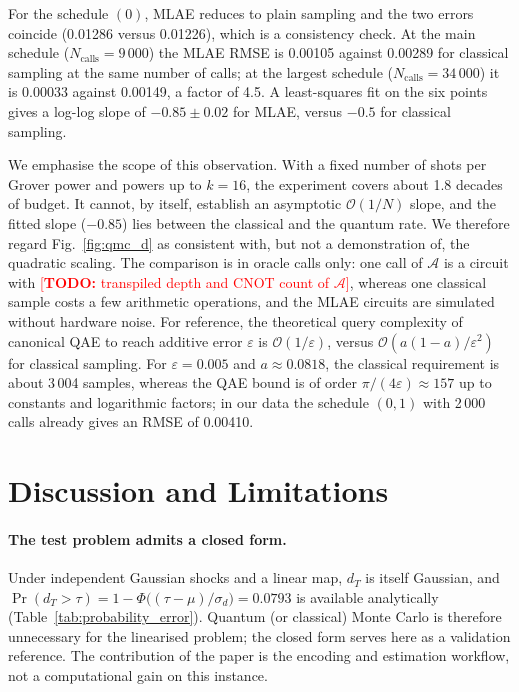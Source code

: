 \documentclass[pdflatex,sn-mathphys-num]{sn-jnl}%
\newcommand{\todo}[1]{\textcolor{red}{[\textbf{TODO:} #1]}}
\theoremstyle{thmstyleone}%
\theoremstyle{thmstyletwo}%
\theoremstyle{thmstylethree}%
\begin{document}
For the schedule $(0)$, MLAE reduces to plain sampling and the two errors coincide (0.01286 versus 0.01226), which is a consistency check. At the main schedule ($N_{\mathrm{calls}}=9\,000$) the MLAE RMSE is 0.00105 against 0.00289 for classical sampling at the same number of calls; at the largest schedule ($N_{\mathrm{calls}}=34\,000$) it is 0.00033 against 0.00149, a factor of 4.5. A least-squares fit on the six points gives a log-log slope of $\ensuremath{-0.85}\pm0.02$ for MLAE, versus $-0.5$ for classical sampling.

We emphasise the scope of this observation. With a fixed number of shots per Grover power and powers up to $k=16$, the experiment covers about 1.8 decades of budget. It cannot, by itself, establish an asymptotic $\mathcal{O}(1/N)$ slope, and the fitted slope ($\ensuremath{-0.85}$) lies between the classical and the quantum rate. We therefore regard Fig.~\ref{fig:qmc_d} as consistent with, but not a demonstration of, the quadratic scaling. The comparison is in oracle calls only: one call of $\mathcal A$ is a circuit with \todo{transpiled depth and CNOT count of $\mathcal A$}, whereas one classical sample costs a few arithmetic operations, and the MLAE circuits are simulated without hardware noise. For reference, the theoretical query complexity of canonical QAE to reach additive error $\varepsilon$ is $\mathcal{O}(1/\varepsilon)$, versus $\mathcal{O}(a(1-a)/\varepsilon^2)$ for classical sampling. For $\varepsilon=0.005$ and $a\approx0.0818$, the classical requirement is about 3\,004 samples, whereas the QAE bound is of order $\pi/(4\varepsilon)\approx157$ up to constants and logarithmic factors; in our data the schedule $(0,1)$ with 2\,000 calls already gives an RMSE of 0.00410.

\section{Discussion and Limitations}\label{sec_disc}

\paragraph{The test problem admits a closed form.} Under independent Gaussian shocks and a linear map, $d_T$ is itself Gaussian, and $\Pr(d_T>\tau)=1-\Phi\bigl((\tau-\mu)/\sigma_d\bigr)=0.0793$ is available analytically (Table~\ref{tab:probability_error}). Quantum (or classical) Monte Carlo is therefore unnecessary for the linearised problem; the closed form serves here as a validation reference. The contribution of the paper is the encoding and estimation workflow, not a computational gain on this instance.
\end{document}
